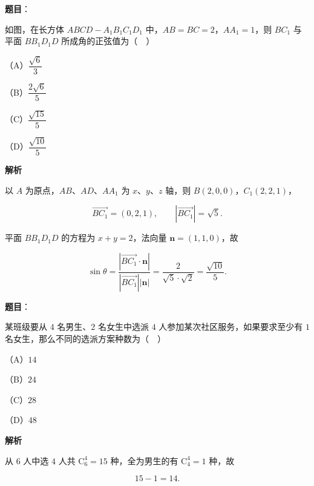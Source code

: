 \begin{answer}

\textbf{题目}：

如图，在长方体 $ABCD-A_1B_1C_1D_1$ 中，$AB=BC=2$，$AA_1=1$，则 $BC_1$ 与平面 $BB_1D_1D$ 所成角的正弦值为（　）

（A）$\dfrac{\sqrt6}{3}$

（B）$\dfrac{2\sqrt6}{5}$

（C）$\dfrac{\sqrt{15}}{5}$

（D）$\dfrac{\sqrt{10}}{5}$
\nopagebreak[4]
\begin{center}\end{center}
\nopagebreak[4]
\textbf{解析}

以 $A$ 为原点，$AB$、$AD$、$AA_1$ 为 $x$、$y$、$z$ 轴，则 $B(2,0,0)$，$C_1(2,2,1)$，

\nopagebreak[4]
\[\overrightarrow{BC_1}=(0,2,1),\qquad |\overrightarrow{BC_1}|=\sqrt5.\]

平面 $BB_1D_1D$ 的方程为 $x+y=2$，法向量 $\boldsymbol n=(1,1,0)$，故

\nopagebreak[4]
\[\sin\theta=\frac{|\overrightarrow{BC_1}\cdot\boldsymbol n|}{|\overrightarrow{BC_1}||\boldsymbol n|}=\frac2{\sqrt5\cdot\sqrt2}=\frac{\sqrt{10}}5.\]


\end{answer}
\begin{answer}

\textbf{题目}：

某班级要从 $4$ 名男生、$2$ 名女生中选派 $4$ 人参加某次社区服务，如果要求至少有 $1$ 名女生，那么不同的选派方案种数为（　）

（A）$14$

（B）$24$

（C）$28$

（D）$48$

\textbf{解析}

从 $6$ 人中选 $4$ 人共 $\mathrm C_6^4=15$ 种，全为男生的有 $\mathrm C_4^4=1$ 种，故

\nopagebreak[4]
\[15-1=14.\]


\end{answer}
